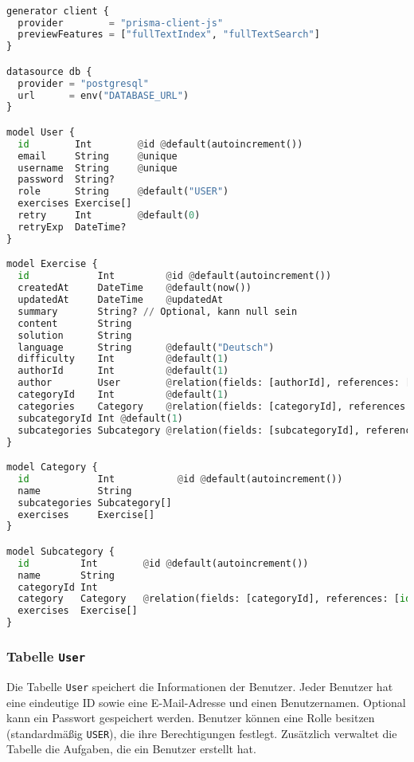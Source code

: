 \documentclass[12pt,a4paper]{article} %
\begin{document}
\begin{lstlisting}[language=Python]

generator client {
  provider        = "prisma-client-js"
  previewFeatures = ["fullTextIndex", "fullTextSearch"]
}

datasource db {
  provider = "postgresql"
  url      = env("DATABASE_URL")
}

model User {
  id        Int        @id @default(autoincrement())
  email     String     @unique
  username  String     @unique 
  password  String?
  role      String     @default("USER")
  exercises Exercise[]
  retry     Int        @default(0)
  retryExp  DateTime?  
}

model Exercise {
  id            Int         @id @default(autoincrement())
  createdAt     DateTime    @default(now())
  updatedAt     DateTime    @updatedAt
  summary       String? // Optional, kann null sein
  content       String
  solution      String
  language      String      @default("Deutsch")
  difficulty    Int         @default(1)
  authorId      Int         @default(1)
  author        User        @relation(fields: [authorId], references: [id])
  categoryId    Int         @default(1)
  categories    Category    @relation(fields: [categoryId], references: [id])
  subcategoryId Int @default(1)
  subcategories Subcategory @relation(fields: [subcategoryId], references: [id])
}

model Category {
  id            Int           @id @default(autoincrement())
  name          String
  subcategories Subcategory[]
  exercises     Exercise[]
}

model Subcategory {
  id         Int        @id @default(autoincrement())
  name       String
  categoryId Int
  category   Category   @relation(fields: [categoryId], references: [id], onDelete: Cascade)
  exercises  Exercise[]
}

\end{lstlisting}




\subsubsection{Tabelle \texttt{User}}

Die Tabelle \texttt{User} speichert die Informationen der Benutzer. Jeder Benutzer hat eine eindeutige ID sowie eine E-Mail-Adresse und einen Benutzernamen. Optional kann ein Passwort gespeichert werden. Benutzer können eine Rolle besitzen (standardmäßig \texttt{USER}), die ihre Berechtigungen festlegt. Zusätzlich verwaltet die Tabelle die Aufgaben, die ein Benutzer erstellt hat.
\end{document}

